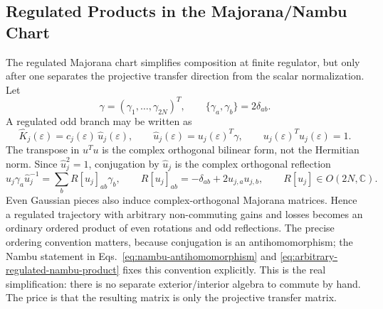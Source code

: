 \documentclass[aps,prb,onecolumn,nofootinbib,superscriptaddress]{revtex4-2}
\theoremstyle{plain}
\theoremstyle{definition}
\begin{document}
\subsection{Regulated Products in the Majorana/Nambu Chart}
\label{sec:regulated-majorana-products}

The regulated Majorana chart simplifies composition at finite regulator, but
only after one separates the projective transfer direction from the scalar
normalization.  Let
\begin{equation}
  \gamma=(\gamma_1,\ldots,\gamma_{2N})^T,
  \qquad
  \{\gamma_a,\gamma_b\}=2\delta_{ab} .
  \label{eq:majorana-vector-convention}
\end{equation}
A regulated odd branch may be written as
\begin{equation}
  \hat K_j(\varepsilon)
  =
  c_j(\varepsilon)\,\hat u_j(\varepsilon),
  \qquad
  \hat u_j(\varepsilon)=u_j(\varepsilon)^T\gamma,
  \qquad
  u_j(\varepsilon)^T u_j(\varepsilon)=1 .
  \label{eq:regulated-branch-pin-factorization}
\end{equation}
The transpose in \(u^Tu\) is the complex orthogonal bilinear form, not the
Hermitian norm.  Since \(\hat u_j^2=1\), conjugation by \(\hat u_j\) is the
complex orthogonal reflection
\begin{equation}
  \hat u_j\gamma_a\hat u_j^{-1}
  =
  \sum_b R[u_j]_{ab}\gamma_b,
  \qquad
  R[u_j]_{ab}=-\delta_{ab}+2u_{j,a}u_{j,b},
  \qquad
  R[u_j]\in O(2N,\mathbb C).
  \label{eq:pin-reflection-matrix}
\end{equation}
Even Gaussian pieces also induce complex-orthogonal Majorana matrices.  Hence
a regulated trajectory with arbitrary non-commuting gains and losses becomes
an ordinary ordered product of even rotations and odd reflections.  The precise
ordering convention matters, because conjugation is an antihomomorphism; the
Nambu statement in Eqs.~\eqref{eq:nambu-antihomomorphism} and
\eqref{eq:arbitrary-regulated-nambu-product} fixes this convention explicitly.
This is the real simplification: there is no separate exterior/interior algebra
to commute by hand.  The price is that the resulting matrix is only the
projective transfer matrix.
\end{document}
